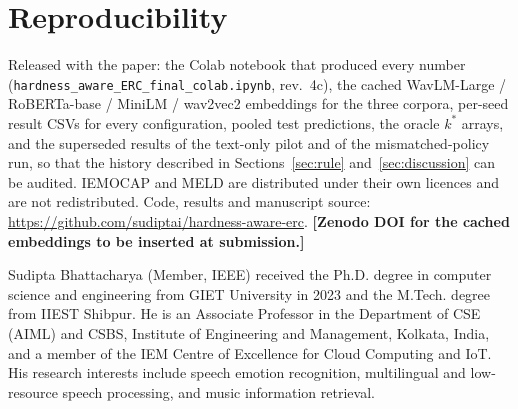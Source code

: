 \documentclass[journal]{IEEEtran}
\newcommand{\TODO}[1]{\textbf{[#1]}}
\begin{document}
\section*{Reproducibility}
Released with the paper: the Colab notebook that produced every number (\texttt{hardness\_aware\_ERC\_final\_colab.ipynb}, rev.~4c), the cached WavLM-Large / RoBERTa-base / MiniLM / wav2vec2 embeddings for the three corpora, per-seed result CSVs for every configuration, pooled test predictions, the oracle $k^*$ arrays, and the superseded results of the text-only pilot and of the mismatched-policy run, so that the history described in Sections~\ref{sec:rule} and~\ref{sec:discussion} can be audited. IEMOCAP and MELD are distributed under their own licences and are not redistributed. Code, results and manuscript source: \url{https://github.com/sudiptai/hardness-aware-erc}. \TODO{Zenodo DOI for the cached embeddings to be inserted at submission.}




\begin{IEEEbiographynophoto}{Sudipta Bhattacharya}
(Member, IEEE) received the Ph.D. degree in computer science and engineering from GIET University in 2023 and the M.Tech. degree from IIEST Shibpur. He is an Associate Professor in the Department of CSE (AIML) and CSBS, Institute of Engineering and Management, Kolkata, India, and a member of the IEM Centre of Excellence for Cloud Computing and IoT. His research interests include speech emotion recognition, multilingual and low-resource speech processing, and music information retrieval.
\end{IEEEbiographynophoto}
\end{document}
